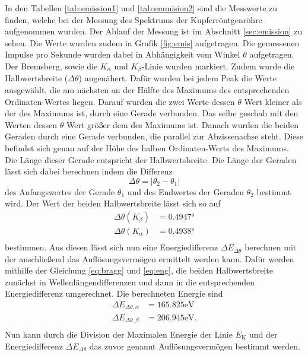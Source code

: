 In den Tabellen \ref{tab:emission1} und \ref{tab:emmision2} sind die Messwerte zu finden, welche bei der Messung des Spektrums der Kupferröntgenröhre aufgenommen wurden.
Der Ablauf der Messung ist im Abschnitt \ref{sec:emission} zu sehen.
Die Werte wurden zudem in Grafik \ref{fig:emis} aufgetragen.
Die gemessenen Impulse pro Sekunde wurden dabei in Abhängigkeit vom Winkel $\theta$ aufgetragen.
Der Bremsberg, sowie die $K_\alpha$ und $K_\beta$-Linie wurden markiert.
Zudem wurde die Halbwertsbreite ($\Delta \theta$) angenähert.
Dafür wurden bei jedem Peak die Werte ausgewählt, die am nächsten an der Hälfte des Maximums des entsprechenden Ordinaten-Wertes liegen.
Darauf wurden die zwei Werte dessen $\theta$ Wert kleiner als der des Maximums ist, durch eine Gerade verbunden.
Das selbe geschah mit den Werten dessen $\theta$ Wert größer dem des Maximums ist.
Danach wurden die beiden Geraden durch eine Gerade verbunden, die parallel zur Abzissenachse steht.
Diese befindet sich genau auf der Höhe des halben Ordinaten-Werts des Maximums.
Die Länge dieser Gerade entspricht der Halbwertsbreite.
Die Länge der Geraden lässt sich dabei berechnen indem die Differenz 
\begin{equation*}
  \Delta \theta = \left | \theta_2-\theta_1 \right |
\end{equation*}
des Anfangswertes der Gerade $\theta_1$ und des Endwertes der Geraden $\theta_2$ bestimmt wird.
Der Wert der beiden Halbwertsbreite lässt sich so auf
\begin{align*}
    \Delta \theta(K_\beta) &=  0.4947 \si{\degree} \\
    \Delta \theta(K_\alpha) &=  0.4938 \si{\degree} \\
\end{align*}
bestimmen.
Aus diesen lässt sich nun eine Energiedifferenz $\Delta E_{\Delta\theta}$ berechnen mit der anschließend das Auflösungsvermögen ermittelt werden kann.
Dafür werden mithilfe der Gleichung \eqref{eq:bragg} und \eqref{eq:eng}, die beiden Halbwertsbreite zunächst in Wellenlängendifferenzen und dann in die entsprechenden Energiedifferenz umgerechnet.
Die berechneten Energie sind
\begin{align*}
    \Delta E_{\Delta\theta, \alpha} &= 165.825\si{\eV}\\
    \Delta E_{\Delta\theta, \beta}  &= 206.945\si{\eV}.\\
\end{align*}
Nun kann durch die Division der Maximalen Energie der Linie $E_\text{K}$ und der Energiedifferenz $\Delta E_{\Delta\theta}$ das zuvor genannt Auflösungsvermögen bestimmt werden.

